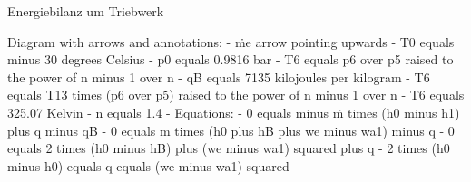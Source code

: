 Energiebilanz um Triebwerk  

Diagram with arrows and annotations:  
- ṁe arrow pointing upwards  
- T0 equals minus 30 degrees Celsius  
- p0 equals 0.9816 bar  
- T6 equals p6 over p5 raised to the power of n minus 1 over n  
- qB equals 7135 kilojoules per kilogram  
- T6 equals T13 times (p6 over p5) raised to the power of n minus 1 over n  
- T6 equals 325.07 Kelvin  
- n equals 1.4  
- Equations:  
  - 0 equals minus ṁ times (h0 minus h1) plus q minus qB  
  - 0 equals m times (h0 plus hB plus we minus wa1) minus q  
  - 0 equals 2 times (h0 minus hB) plus (we minus wa1) squared plus q  
  - 2 times (h0 minus h0) equals q equals (we minus wa1) squared